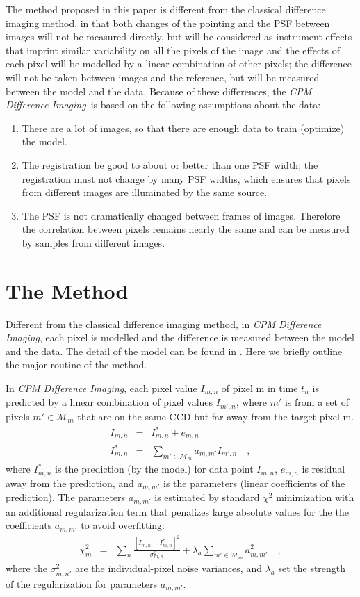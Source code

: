 \documentclass[12pt, preprint]{aastex}
\newcommand{\project}[1]{\textsl{#1}}
\newcommand{\cpmdiff}{\project{CPM Difference Imaging}}
\newcommand{\set}[1]{\mathcal{#1}}
\begin{document}
The method proposed in this paper is different from the classical difference imaging method, in that both changes of the pointing and the PSF between images will not be measured directly, but will be considered as instrument effects that imprint similar variability on all the pixels of the image and the effects of each pixel will be modelled by a linear combination of other pixels;  the difference will not be taken between images and the reference, but will be measured between the model and the data.
Because of these differences, the \cpmdiff\ is based on the following assumptions about the data:
\begin{enumerate}
\item
There are a lot of images, so that there are enough data to train (optimize) the model.
\item
The registration be good to about or better than one PSF width; the registration must not change by many PSF widths, which ensures that pixels from different images are illuminated by the same source.
\item
The PSF is not dramatically changed between frames of images. Therefore the correlation between pixels remains nearly the same and can be measured by samples from different images.
\end{enumerate}

\section{The Method}
Different from the classical difference imaging method, in \cpmdiff, each pixel is modelled and the difference is measured between the model and the data. The detail of the model can be found in \cite{cpm}. Here we briefly outline the major routine of the method.

In \cpmdiff, each pixel value $I_{m,n}$ of pixel m in time $t_n$ is predicted by a linear combination of pixel values $I_{m',n}$, where $m'$ is from a set of pixels $m'\in\set{M}_m$ that are on the same CCD but far away from the target pixel m.
\begin{eqnarray}
I_{m,n}         &=& I^{\ast}_{m,n} + e_{m,n}
\\
I^{\ast}_{m,n}  &=& \sum_{m'\in\set{M}_m} a_{m,m'}I_{m',n} 
\quad,
\end{eqnarray}
where $I^{\ast}_{m,n}$ is the prediction (by the model) for data point $I_{m,n}$, $e_{m,n}$ is residual away from the prediction, and $a_{m,m'}$ is the parameters (linear coefficients of the prediction).
The parameters $a_{m,m'}$ is estimated by standard $\chi^2$ minimization with an additional regularization term that penalizes large absolute values for the the coefficients $a_{m,m'}$ to avoid overfitting:
\begin{eqnarray}
\chi^2_{m}    &=& \sum_{n} \frac{[I_{m,n} - I^{\ast}_{m,n}]^2}{\sigma^2_{m,n}}+ \lambda_{a}\sum_{m'\in\set{M}_m}a_{m,m'}^2 
\quad,
\end{eqnarray}
where the $\sigma^2_{m,n'}$ are the individual-pixel noise variances, and $\lambda_{a}$ set the strength of the regularization for parameters $a_{m,m'}$.
\end{document}
